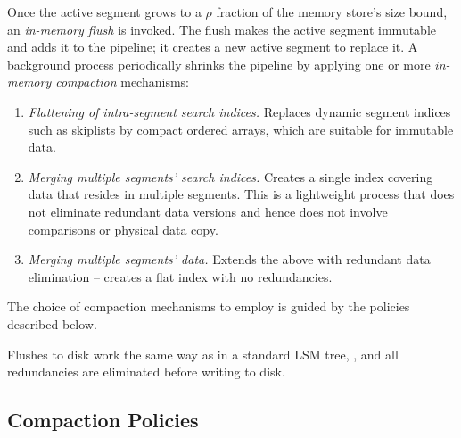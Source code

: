 Once the active segment grows to a $\rho$ fraction of the memory store's size bound, an \emph{in-memory flush} is invoked.
The flush makes the active segment  immutable and adds it to the pipeline; it creates a new active segment to replace it. 
A background process periodically shrinks the pipeline by applying 
one or more \emph{in-memory compaction} mechanisms: 
\begin{enumerate}
\item {\em Flattening of intra-segment search indices.} Replaces dynamic segment indices such as skiplists by 
compact ordered arrays, which are suitable for immutable data. 
\item {\em Merging multiple segments' search indices.} 
Creates a single index covering data that resides in multiple segments. 
This is a lightweight process that does not eliminate redundant data versions 
and hence does not involve comparisons or physical data copy. 
\item  {\em Merging multiple segments' data.} Extends the above with redundant data elimination -- creates
a flat index with no redundancies. 
\end{enumerate} 
The choice of compaction mechanisms to employ is guided by the policies described below.

Flushes to disk work the same way as in a standard LSM tree, 
, and all 
redundancies are eliminated before writing to disk.

 
 

\subsection{Compaction Policies} \label{ssec:policies}

